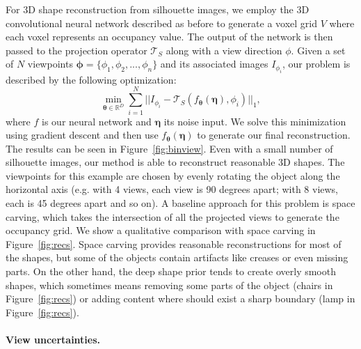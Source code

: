 For 3D shape reconstruction from silhouette images, we employ the 3D convolutional neural network described as before to generate a voxel grid $V$ where each voxel represents an occupancy value.
The output of the network is then passed to the projection operator $\mathcal{T}_S$ along with a view direction $\phi$.
Given a set of $N$ viewpoints $\bm{\phi} = \{\phi_1, \phi_2, ..., \phi_n\}$ and its associated images $I_{\phi_i}$, our problem is described by the following optimization:
\begin{equation}
    \label{eq:silh}
	\min_{\bm{\theta} \in \mathbb{R}^D} \sum_{i=1}^N||I_{\phi_i} - \mathcal{T}_S(f_{\bm{\theta}}(\bm{\eta}), \phi_i)||_1,
\end{equation}
where $f$ is our neural network and $\bm{\eta}$ its noise input. We solve this minimization using gradient descent and then use $f_{\bm{\theta}}(\bm{\eta})$ to generate our final reconstruction.
The results can be seen in Figure~\ref{fig:binview}.
Even with a small number of silhouette images, our method is able to reconstruct reasonable 3D
shapes.
The viewpoints for this example are chosen by evenly rotating the object along the horizontal axis (e.g. with 4 views, each view is 90 degrees apart; with 8 views, each is 45 degrees apart and so on).
A baseline approach for this problem is space carving, which takes the intersection of all the projected views to generate the occupancy grid.
We show a qualitative comparison with space carving in Figure~\ref{fig:recs}.
Space carving provides reasonable reconstructions for most of the shapes, but some of the objects contain artifacts like creases or even missing parts.
On the other hand, the deep shape prior tends to create overly smooth shapes, which sometimes means removing some parts of the object (chairs in Figure~\ref{fig:recs}) or adding content
where should exist a sharp boundary (lamp in Figure~\ref{fig:recs}).

\paragraph*{View uncertainties.}

